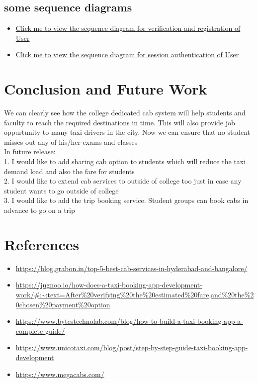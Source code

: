 \documentclass[conference]{IEEEtran}
\begin{document}
\subsection{some sequence diagrams}
\begin{itemize}
\item \href{https://iiitaphyd-my.sharepoint.com/:f:/g/personal/jujjuru_ruchitha_students_iiit_ac_in/Evyw5AfMy19JpH4KClBtnaIBoQvmyfHD7ZdB8GWuyUEfBg?e=yMrs6y}{Click me to view the sequence diagram for verification and registration of User
}
\item \href{https://iiitaphyd-my.sharepoint.com/:f:/g/personal/jujjuru_ruchitha_students_iiit_ac_in/Evyw5AfMy19JpH4KClBtnaIBoQvmyfHD7ZdB8GWuyUEfBg?e=yMrs6y}{Click me to view the sequence diagram for session authentication of User
}
\end{itemize}



\section{Conclusion and Future Work}
We can clearly see how the college dedicated cab system will help students and faculty to reach the required destinations in time. This will also provide job oppurtunity to many taxi drivers in the city. Now we can ensure that no student misses out any of his/her exams and classes\\
In future release:\\
1. I would like to add sharing cab option to students which will reduce the taxi demand load and also the fare for students\\
2. I would like to extend cab services to outside of college too just in case any student wants to go outside of college\\
3. I would like to add the trip booking service. Student groups can book cabs in advance to go on a trip\\


\section{References}
\begin{itemize}
\item \url{https://blog.grabon.in/top-5-best-cab-services-in-hyderabad-and-bangalore/}
\item \url{https://jugnoo.io/how-does-a-taxi-booking-app-development-work/#:~:text=After%20verifying%20the%20estimated%20fare,and%20the%20chosen%20payment%20option}
\item \url{https://www.bytestechnolab.com/blog/how-to-build-a-taxi-booking-app-a-complete-guide/}
\item \url{https://www.unicotaxi.com/blog/post/step-by-step-guide-taxi-booking-app-development}
\item \url{https://www.megacabs.com/}
\end{itemize}
\end{document}
